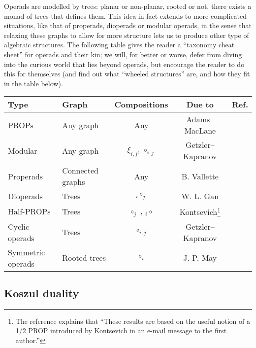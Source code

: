 Operads are modelled by trees: planar or
non-planar, rooted or not, there exists a monad
of trees that defines them. This idea
 in fact extends
to more complicated situations, like that of
properads, dioperads or modular operads,
in the sense that relaxing these
graphs to allow for more structure 
lets us to produce other type of 
algebraic structures. The following table
gives the reader a ``taxonomy cheat sheet''
for operads and their kin; we will, for better
or worse, defer from diving into the curious
world that lies beyond operads, but encourage
the reader to do this for themselves (and find
out what ``wheeled structures'' are, and how
they fit in the table below).

\begin{center}
\begin{tabular}{@{}llccr@{}} \toprule
Type & Graph & Compositions & Due to & Ref.\\ \midrule
PROPs & Any graph & Any  & Adams--MacLane \\
Modular & Any graph & $\xi_{i,j}$, $\circ_{i,j}$  & Getzler--Kapranov & \cite{Getzler1998}\\ 
Properads & Connected graphs & Any & B. Vallette & \cite{Vallette2004}\\
Dioperads & Trees & ${}_i\circ_j$ & W. L. Gan & \cite{Gan2003}\\
Half-PROPs & Trees & $\circ_j$ , ${}_i\circ$ & 
 Kontsevich\footnote{The reference explains that ``These results are based on the useful notion of a 1/2 PROP introduced by Kontsevich in an e-mail message to the first author.''} & \cite{Markl2007}\\ 
Cyclic operads & Trees &  $\circ_{i,j}$ & Getzler--Kapranov & \cite{Kajiura2008}\\ 
Symmetric operads & Rooted trees & $\circ_i$  & J. P. May & \cite{May1972}\\ 
\bottomrule
\end{tabular}
\end{center}

\subsection{Koszul duality}
 
